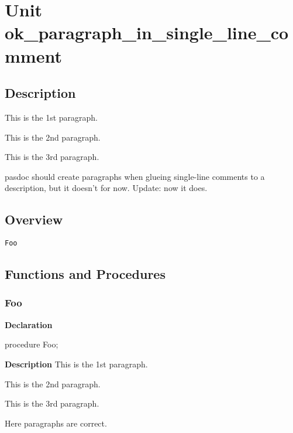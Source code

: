 \documentclass{report}
\begin{document}
\chapter{Unit ok{\_}paragraph{\_}in{\_}single{\_}line{\_}comment}
\section{Description}
This is the 1st paragraph.

This is the 2nd paragraph.

This is the 3rd paragraph.

pasdoc should create paragraphs when glueing single{-}line comments to a description, but it doesn't for now. Update: now it does.
\section{Overview}
\begin{description}
\item[\texttt{Foo}]
\end{description}
\section{Functions and Procedures}
\subsection*{Foo}
\begin{list}{}{
\setlength{\itemindent}{0cm}
\setlength{\listparindent}{0cm}
\setlength{\leftmargin}{\evensidemargin}
\addtolength{\leftmargin}{\tmplength}
\settowidth{\labelsep}{X}
\addtolength{\leftmargin}{\labelsep}
\setlength{\labelwidth}{\tmplength}
}
\begin{flushleft}
\item[\textbf{Declaration}\hfill]
\begin{ttfamily}
procedure Foo;\end{ttfamily}


\end{flushleft}
\par
\item[\textbf{Description}]
This is the 1st paragraph.

This is the 2nd paragraph.

This is the 3rd paragraph.

Here paragraphs are correct.

\end{list}
\end{document}
